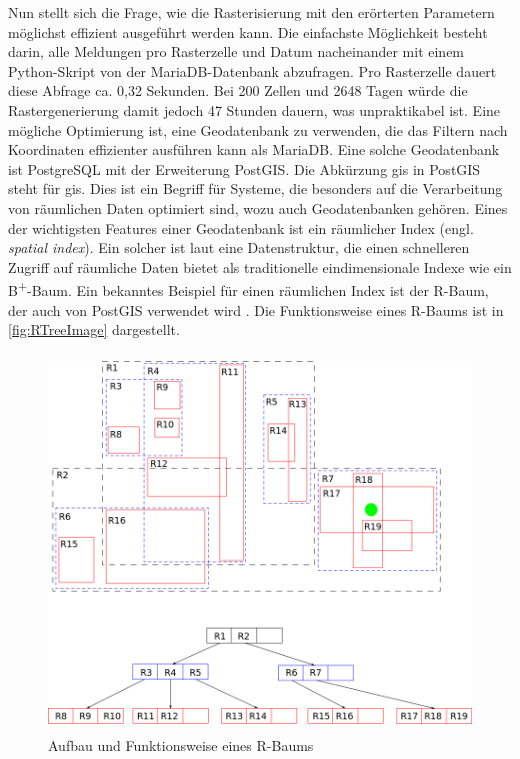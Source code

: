 Nun stellt sich die Frage, wie die Rasterisierung mit den erörterten Parametern möglichst effizient ausgeführt werden kann.
Die einfachste Möglichkeit besteht darin, alle Meldungen pro Rasterzelle und Datum nacheinander mit einem Python-Skript von der MariaDB-Datenbank abzufragen.
Pro Rasterzelle dauert diese Abfrage ca. 0,32 Sekunden.
Bei 200 Zellen und 2648 Tagen würde die Rastergenerierung damit jedoch 47 Stunden dauern, was unpraktikabel ist.
Eine mögliche Optimierung ist, eine Geodatenbank zu verwenden, die das Filtern nach Koordinaten effizienter ausführen kann als MariaDB.
Eine solche Geodatenbank ist PostgreSQL mit der Erweiterung PostGIS.
Die Abkürzung \acrshort{gis} in PostGIS steht für \acrlong{gis}.
Dies ist ein Begriff für Systeme, die besonders auf die Verarbeitung von räumlichen Daten optimiert sind, wozu auch Geodatenbanken gehören.
Eines der wichtigsten Features einer Geodatenbank ist ein räumlicher Index (engl. \emph{spatial index}).
Ein solcher ist laut \cite[S. 2707 f.]{SpatialIndexingTechniques} eine Datenstruktur, die einen schnelleren Zugriff auf räumliche Daten bietet als traditionelle eindimensionale Indexe wie ein B\textsuperscript{+}-Baum.
Ein bekanntes Beispiel für einen räumlichen Index ist der R-Baum, der auch von PostGIS verwendet wird \cite{PostGISSpatialIndex}.
Die Funktionsweise eines R-Baums ist in \autoref{fig:RTreeImage} dargestellt.

\begin{figure}[h]
    \centering
    \includegraphics[width=1.0\textwidth,height=10cm,keepaspectratio=true]{content/images/R-tree.png}
    \caption{Aufbau und Funktionsweise eines R-Baums \cite{RTreeImage}}
    \label{fig:RTreeImage}
\end{figure}

